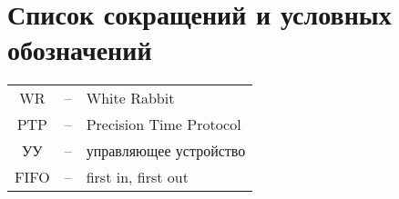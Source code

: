 \chapter*{Список сокращений и условных обозначений}             %
\noindent
\addtocounter{table}{-1}%

\noindent
\begin{tabular}{ccl}
WR & -- & White Rabbit\\
PTP & -- & Precision Time Protocol\\
УУ & -- & управляющее устройство\\
FIFO & -- & first in, first out \\
\end{tabular}